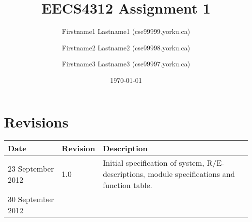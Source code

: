 \documentclass[fontsize=12pt,paper=letter,twoside]{scrartcl}
\title{EECS4312 Assignment 1}
\author{Firstname1 Lastname1 (cse99999\@cse.yorku.ca)
\and Firstname2 Lastname2 (cse99998\@cse.yorku.ca)
\and Firstname3 Lastname3 (cse99997\@cse.yorku.ca)}
\date{\today} %
\begin{document}
\maketitle

\section*{Revisions}

\begin{tabular}{|l|l|p{3in}|}
\hline
Date & Revision& Description \\ 
\hline
23 September  2012 
& 1.0       
& Initial specification of system, R/E- descriptions, 
module specifications and function table.\\ 
\hline
 30 September 2012
& ~       
& ~        \\
\hline
\end{tabular}
\newpage
\tableofcontents
\listoffigures
\listoftables
\newpage




\end{document}
